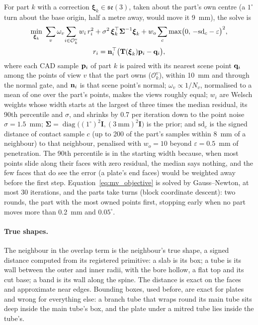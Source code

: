 For part $k$ with a correction $\boldsymbol{\xi}_k\in\mathfrak{se}(3)$, taken about the part's own
centre (a $1^\circ$ turn about the base origin, half a metre away, would move it 9~mm), the solve is
\begin{equation}
\begin{gathered}
\min_{\boldsymbol{\xi}_k}\ \sum_{v}\omega_v\!\sum_{i\in\mathcal{O}_k^v} w_i\,r_i^2
+ \sigma^2\,\boldsymbol{\xi}_k^{\top}\boldsymbol{\Sigma}^{-1}\boldsymbol{\xi}_k
+ w_o\sum_{c}\max\!\big(0,\,-\mathrm{sd}_c-\varepsilon\big)^2,\\
r_i=\mathbf{n}_i^{\top}\big(\mathbf{T}(\boldsymbol{\xi}_k)\mathbf{p}_i-\mathbf{q}_i\big),
\end{gathered}
\label{eq:mv_objective}
\end{equation}
where each CAD sample $\mathbf{p}_i$ of part $k$ is paired with its nearest scene point $\mathbf{q}_i$
among the points of view $v$ that the part owns ($\mathcal{O}_k^v$), within 10~mm and through the
normal gate, and $\mathbf{n}_i$ is that scene point's normal; $\omega_v\propto1/N_v$, normalised to a
mean of one over the part's points, makes the views roughly equal;
$w_i$ are Welsch weights whose width starts at the largest of three times the median residual, its
90th percentile and $\sigma$, and shrinks by 0.7 per iteration down to the point noise
$\sigma=1.5$~mm; $\boldsymbol{\Sigma}=\operatorname{diag}\big((1^\circ)^2\mathbf{I},(3~\mathrm{mm})^2\mathbf{I}\big)$
is the prior; and $\mathrm{sd}_c$ is the signed distance of contact sample $c$ (up to 200 of the
part's samples within 8~mm of a neighbour) to that neighbour, penalised with $w_o=10$ beyond
$\varepsilon=0.5$~mm of penetration. The 90th percentile is in the starting width because, when
most points slide along their faces with zero residual, the median says nothing, and the few faces
that do see the error (a plate's end faces) would be weighted away before the first step.
Equation~\ref{eq:mv_objective} is solved by Gauss--Newton, at most 30 iterations, and the parts take
turns (block coordinate descent): two rounds, the part with the most owned points first, stopping
early when no part moves more than 0.2~mm and $0.05^\circ$.

\paragraph{True shapes.} The neighbour in the overlap term is the neighbour's true shape, a signed
distance computed from its registered primitive: a slab is its box; a tube is its wall between the
outer and inner radii, with the bore hollow, a flat top and its cut base; a band is its wall along
the spine. The distance is exact on the faces and approximate near edges. Bounding boxes, used
before, are exact for plates and wrong for everything else: a branch tube that wraps round its main
tube sits deep inside the main tube's box, and the plate under a mitred tube lies inside the tube's.
